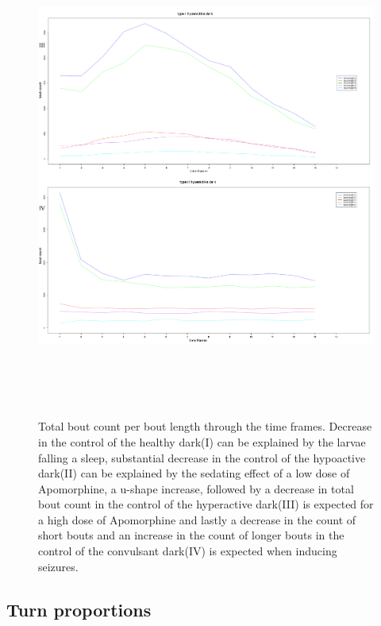 \documentclass[a4paper,12pt]{article}
\begin{document}
\begin{figure}[h!]
\begin{center}
\includegraphics[width=15cm,height=16cm]{countChangeTime2.png}
\caption{Total bout count per bout length through the time frames. Decrease in the control of the healthy dark(I) can be explained by the larvae falling a sleep, substantial decrease in the control of the hypoactive dark(II) can be explained by the sedating effect of a low dose of Apomorphine, a u-shape increase, followed by a decrease in total bout count in the control of the hyperactive dark(III) is expected for a high dose of Apomorphine\cite{ref17} and lastly a decrease in the count of short bouts and an increase in the count of longer bouts in the control of the convulsant dark(IV) is expected when inducing seizures\cite{ref14}.}
\end{center}
\end{figure}


\subsection{Turn proportions}
\end{document}

